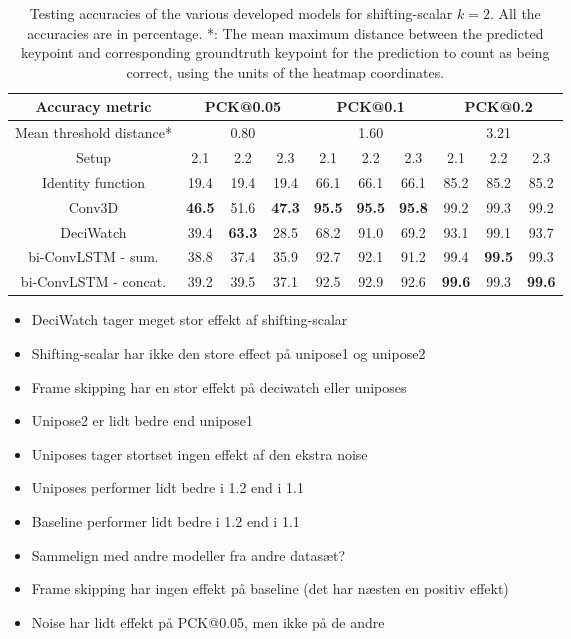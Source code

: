 \documentclass[./main.tex]{subfiles}
\begin{document}
\begin{table}[htbp]
    \begin{tabular}{c||ccc|ccc|ccc}
        \hline
        Accuracy metric & \multicolumn{3}{c}{PCK@0.05} & \multicolumn{3}{c}{PCK@0.1} & \multicolumn{3}{c}{PCK@0.2} \\
        \hline
        Mean threshold distance* & \multicolumn{3}{c}{0.80} & \multicolumn{3}{c}{1.60} & \multicolumn{3}{c}{3.21} \\
        \hline
        Setup & 2.1 & 2.2 & 2.3 & 2.1 & 2.2 & 2.3 & 2.1 & 2.2 & 2.3 \\
        \hline
        \hline
        Identity function & 19.4 & 19.4 & 19.4 & 66.1 & 66.1 & 66.1 & 85.2 & 85.2 & 85.2 \\
        Conv3D & \textbf{46.5} & 51.6 & \textbf{47.3} & \textbf{95.5} & \textbf{95.5} & \textbf{95.8} & 99.2 & 99.3 & 99.2 \\
        DeciWatch & 39.4 & \textbf{63.3} & 28.5 & 68.2 & 91.0 & 69.2 & 93.1 & 99.1 & 93.7 \\
        bi-ConvLSTM - sum. & 38.8 & 37.4 & 35.9 & 92.7 & 92.1 & 91.2 & 99.4 & \textbf{99.5} & 99.3 \\
        bi-ConvLSTM - concat. & 39.2 & 39.5 & 37.1 & 92.5 & 92.9 & 92.6 & \textbf{99.6} & 99.3 & \textbf{99.6} \\
        \hline
    \end{tabular}
    \caption{Testing accuracies of the various developed models for shifting-scalar $k = 2$. All the accuracies are in percentage. *: The mean maximum distance between the predicted keypoint and corresponding groundtruth keypoint for the prediction to count as being correct, using the units of the heatmap coordinates.}
    \label{tab:finetune_test_accs_2}
\end{table}

\begin{itemize}
    \item DeciWatch tager meget stor effekt af shifting-scalar
    \item Shifting-scalar har ikke den store effect på unipose1 og unipose2
    \item Frame skipping har en stor effekt på deciwatch eller uniposes
    \item Unipose2 er lidt bedre end unipose1
    \item Uniposes tager stortset ingen effekt af den ekstra noise
    \item Uniposes performer lidt bedre i 1.2 end i 1.1
    \item Baseline performer lidt bedre i 1.2 end i 1.1
    \item Sammelign med andre modeller fra andre datasæt?
    \item Frame skipping har ingen effekt på baseline (det har næsten en positiv effekt)
    \item Noise har lidt effekt på PCK@0.05, men ikke på de andre
\end{itemize}
\end{document}
